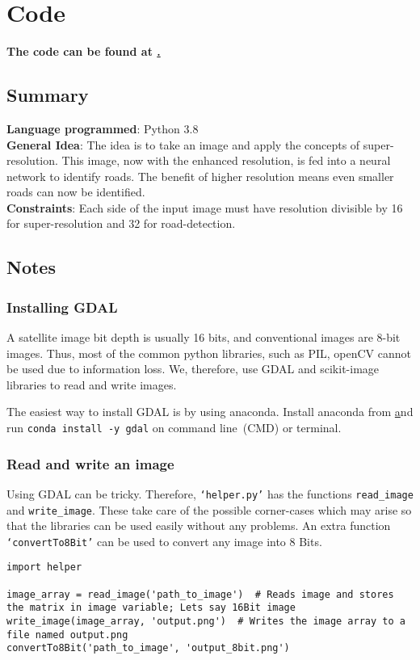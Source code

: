\chapter{Code}\label{chapt:code}
\textbf{The code can be found at \href{https://nautatva.github.io/btp/code}.}

\section{Summary}
\textbf{Language programmed}: Python 3.8 \bigskip \\
\textbf{General Idea}: The idea is to take an image and apply the concepts of super-resolution. This image, now with the enhanced resolution, is fed into a neural network to identify roads. The benefit of higher resolution means even smaller roads can now be identified. \bigskip \\
\textbf{Constraints}: Each side of the input image must have resolution divisible by 16 for super-resolution and 32 for road-detection.


\section{Notes}
\subsection{Installing GDAL}
A satellite image bit depth is usually 16 bits, and conventional images are 8-bit images. Thus, most of the common python libraries, such as PIL, openCV cannot be used due to information loss. We, therefore, use GDAL and scikit-image libraries to read and write images.

The easiest way to install GDAL is by using anaconda. Install anaconda from \href{https://www.anaconda.com/products/individual#Downloads} and run \texttt{conda install -y gdal} on command line~(CMD) or terminal.


\subsection{Read and write an image}
Using GDAL can be tricky. Therefore, \texttt{`helper.py'} has the functions \texttt{read\_image} and \texttt{write\_image}. These take care of the possible corner-cases which may arise so that the libraries can be used easily without any problems. An extra function \texttt{`convertTo8Bit'} can be used to convert any image into 8 Bits.

\begin{verbatim}
import helper

image_array = read_image('path_to_image')  # Reads image and stores the matrix in image variable; Lets say 16Bit image
write_image(image_array, 'output.png')  # Writes the image array to a file named output.png
convertTo8Bit('path_to_image', 'output_8bit.png')
\end{verbatim}


